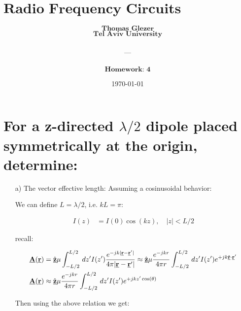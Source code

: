 \documentclass[12pt, letterpaper]{article}
\title{
  \Large $\textbf{Radio Frequency Circuits \& Antenna}$
}
\author{
  $\textbf{Thomas Glezer}$\\
  $\textbf{Tel Aviv University}$\\\\
  ---\\\\
  $\textbf{Homework: 4}$\\
}
\date{\today}
\begin{document}
\begin{titlingpage}
  \maketitle
\end{titlingpage}

\pagebreak

\section{For a z-directed $\lambda/2$ dipole placed symmetrically at the origin, determine:}

\begin{itemize}
  \item [a)] The vector effective length:
  Assuming a cosinusoidal behavior:

  We can define $L=\lambda/2$, i.e. $kL=\pi$:

  \begin{align*}
    I(z)
    &=
    I(0)\cos(kz), \quad |z|<L/2
  \end{align*}

  recall:

  \begin{align*}
    \underline{\vb{A}}(\underline{\vb{r}})
    &=
    \underline{\hat{\vb{z}}}\mu
    \int_{-L/2}^{L/2}
    \,dz'I(z')
    {
      e^{-jk|\underline{\vb{r}}-\underline{\vb{r}}'|}
      \over
      4\pi|\underline{\vb{r}}-\underline{\vb{r}}'|
    }
    \approx
    \underline{\hat{\vb{z}}}\mu
    {
      e^{-jkr}
      \over
      4\pi r
    }
    \int_{-L/2}^{L/2}
    \,dz'I(z')
    e^{+jk\underline{\hat{\vb{r}}}\cdot\underline{\vb{r}}'}
    \\
    \underline{\vb{A}}(\underline{\vb{r}})
    &\approx
    \underline{\hat{\vb{z}}}\mu
    {
      e^{-jkr}
      \over
      4\pi r
    }
    \int_{-L/2}^{L/2}
    \,dz'I(z')
    e^{+jkz'\cos(\theta)}
  \end{align*}

  Then using the above relation we get:


\end{itemize}
\end{document}
